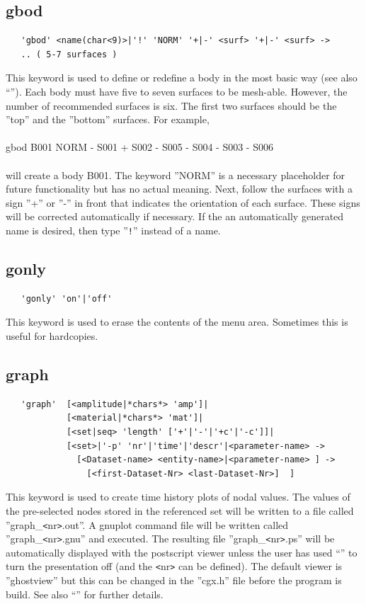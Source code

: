 \documentclass{article}
\begin{document}
\subsection{\label{gbod}gbod}
\begin{verbatim}
   'gbod' <name(char<9)>|'!' 'NORM' '+|-' <surf> '+|-' <surf> ->
   .. ( 5-7 surfaces )
\end{verbatim}
This keyword is used to define or redefine a body in the most basic way (see also ``''). Each body must have five to seven surfaces to be mesh-able. However, the number of recommended surfaces is six. The first two surfaces should be the ''top'' and the ''bottom'' surfaces. For example,\\\\gbod B001 NORM - S001 + S002 - S005 - S004 - S003 - S006\\\\will create a body B001. The keyword ''NORM'' is a necessary placeholder for future functionality but has no actual meaning. Next, follow the surfaces with a sign ''+'' or ''-'' in front that indicates the orientation of each surface. These signs will be corrected automatically if necessary. If the an automatically generated name is desired, then type ''\verb_!_'' instead of a name.

\subsection{\label{gonly}gonly}
\begin{verbatim}
   'gonly' 'on'|'off' 
\end{verbatim}
This keyword is used to erase the contents of the menu area. Sometimes this is useful for hardcopies.

\subsection{\label{graph}graph}
\begin{verbatim}
   'graph'  [<amplitude|*chars*> 'amp']|
            [<material|*chars*> 'mat']|
            [<set|seq> 'length' ['+'|'-'|'+c'|'-c']]| 
            [<set>|'-p' 'nr'|'time'|'descr'|<parameter-name> ->
              [<Dataset-name> <entity-name>|<parameter-name> ] ->
                [<first-Dataset-Nr> <last-Dataset-Nr>]  ]

\end{verbatim}
This keyword is used to create time history plots of nodal values. The values of the pre-selected nodes stored in the referenced set will be written to a file called ''graph\_\verb_<_nr\verb_>_.out''. A gnuplot command file will be written called ''graph\_\verb_<_nr\verb_>_.gnu'' and executed. The resulting file ''graph\_\verb_<_nr\verb_>_.ps'' will be automatically displayed with the postscript viewer unless the user has used ``'' to turn the presentation off (and the \verb_<_nr\verb_>_ can be defined). The default viewer is ''ghostview'' but this can be changed in the ''cgx.h'' file before the program is build. See also ``'' for further details.
\end{document}
